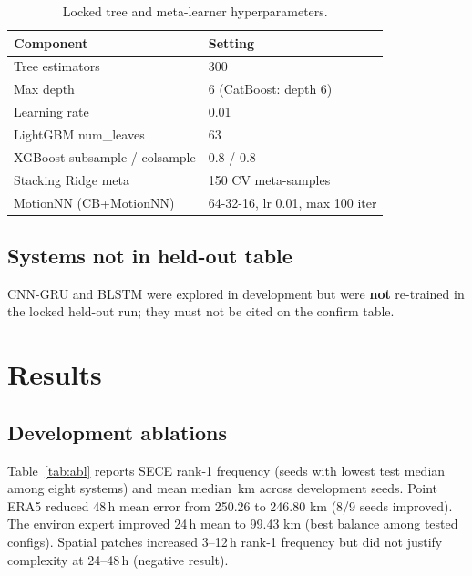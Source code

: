 \documentclass[11pt]{article}
\newcommand{\sece}{SECE}
\newcommand{\era}{ERA5}
\newcommand{\km}{\,km}
\begin{document}
\begin{table}[ht]
\caption{Locked tree and meta-learner hyperparameters.}
\label{tab:hyp}
\centering
\small
\begin{tabular}{@{}ll@{}}
\toprule
Component & Setting \\
\midrule
Tree estimators & 300 \\
Max depth & 6 (CatBoost: depth 6) \\
Learning rate & 0.01 \\
LightGBM num\_leaves & 63 \\
XGBoost subsample / colsample & 0.8 / 0.8 \\
Stacking Ridge meta & 150 CV meta-samples \\
MotionNN (CB+MotionNN) & 64-32-16, lr 0.01, max 100 iter \\
\bottomrule
\end{tabular}
\end{table}

\subsection{Systems not in held-out table}
CNN-GRU and BLSTM were explored in development but were \textbf{not} re-trained in the locked held-out run; they must not be cited on the confirm table.

\section{Results}
\label{sec:results}

\subsection{Development ablations}
Table~\ref{tab:abl} reports \sece{} rank-1 frequency (seeds with lowest test median among eight systems) and mean median \km{} across development seeds.
Point \era{} reduced 48\,h mean error from 250.26 to 246.80\,\km{} (8/9 seeds improved).
The environ expert improved 24\,h mean to 99.43\,\km{} (best balance among tested configs).
Spatial patches increased 3--12\,h rank-1 frequency but did not justify complexity at 24--48\,h (negative result).
\end{document}
